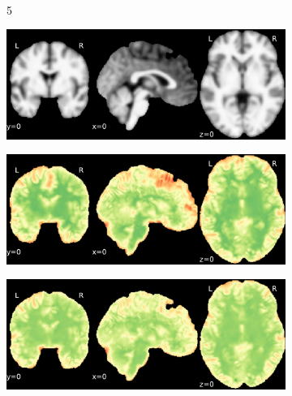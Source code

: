 \documentclass{article}
\begin{document}
\begin{appendices}
\begin{landscape}
\begin{figure}
\begin{subfigure}[t]{0.2\paperheight}
            \end{subfigure} \\
            \begin{subfigure}[b][][c]{0.01\paperwidth} 5 \vspace*{15pt} \end{subfigure}
            \begin{subfigure}[t]{0.2\paperheight}
                \centering
                \includegraphics[width=\textwidth]{figures/sig/5mm/ieee_ds001748_sub-adult15.pdf}
            \end{subfigure}
            \begin{subfigure}[t]{0.2\paperheight}
                \centering
                \includegraphics[width=\textwidth]{figures/sig/5mm/rr_ds001748_sub-adult15_sig.pdf}
            \end{subfigure}
            \begin{subfigure}[t]{0.2\paperheight}
                \centering
                \includegraphics[width=\textwidth]{figures/sig/5mm/rs_ds001748_sub-adult15_sig.pdf}

\end{subfigure}
\end{figure}
\end{landscape}
\end{appendices}
\end{document}

